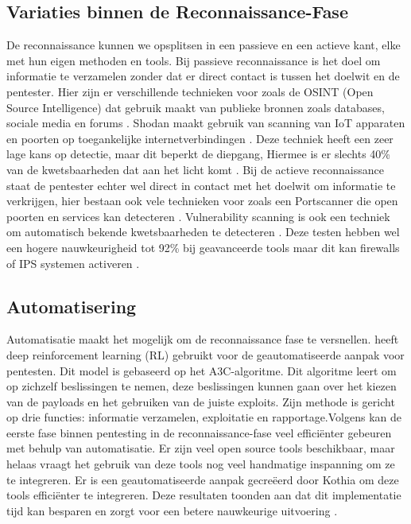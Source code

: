 \subsection{Variaties binnen de Reconnaissance-Fase}
De reconnaissance kunnen we opsplitsen in een passieve en een actieve kant, elke met hun eigen methoden en tools. Bij passieve reconnaissance is het doel om informatie te verzamelen zonder dat er direct contact is tussen het doelwit en de pentester.
Hier zijn er verschillende technieken voor zoals de OSINT (Open Source Intelligence) dat gebruik maakt van publieke bronnen zoals databases, sociale media en forums \autocite{3_Dalalana2017}. Shodan maakt gebruik van scanning van IoT apparaten en poorten op toegankelijke internetverbindingen \autocite{12_Monero2025}.
Deze techniek heeft een zeer lage kans op detectie, maar dit beperkt de diepgang, Hiermee is er slechts 40\% van de kwetsbaarheden dat aan het licht komt \autocite{13_Mahin2014}.
Bij de actieve reconnaissance staat de pentester echter wel direct in contact met het doelwit om informatie te verkrijgen, hier bestaan ook vele technieken voor zoals een Portscanner die open poorten en services kan detecteren \autocite{12_Monero2025}. Vulnerability scanning is ook een techniek om automatisch bekende kwetsbaarheden te detecteren \autocite{4_GOEL2015}. Deze testen hebben wel een hogere nauwkeurigheid tot 92\% bij geavanceerde tools maar dit kan firewalls of IPS systemen activeren \autocite{14_Li2022}.

\subsection{Automatisering}
Automatisatie maakt het mogelijk om de reconnaissance fase te versnellen. \textcite{20_Hoang2022} heeft deep reinforcement learning (RL) gebruikt voor de geautomatiseerde aanpak voor pentesten. Dit model is gebaseerd op het A3C-algoritme. Dit algoritme leert om op zichzelf beslissingen te nemen, deze beslissingen kunnen gaan over het kiezen van de payloads en het gebruiken van de juiste exploits. Zijn methode is gericht op drie functies: informatie verzamelen, exploitatie en rapportage\autocite{20_Hoang2022}.Volgens \textcite{10_Kothia2019} kan de eerste fase binnen pentesting in de reconnaissance-fase veel efficiënter gebeuren met behulp van automatisatie. Er zijn veel open source tools beschikbaar, maar helaas vraagt het gebruik van deze tools nog veel handmatige inspanning om ze te integreren.
Er is een geautomatiseerde aanpak gecreëerd door Kothia om deze tools efficiënter te integreren. Deze resultaten toonden aan dat dit implementatie tijd kan besparen en zorgt voor een betere nauwkeurige uitvoering \autocite{10_Kothia2019}.

